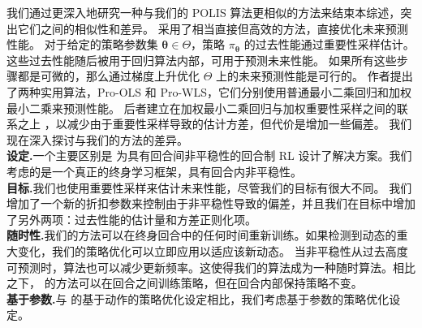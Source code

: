 我们通过更深入地研究一种与我们的 POLIS 算法更相似的方法来结束本综述，突出它们之间的相似性和差异。
\cite{chandak2020optimizing} 采用了相当直接但高效的方法，直接优化未来预测性能。
对于给定的策略参数集 $\boldsymbol\theta\in\Theta$，策略 $\pi_{\boldsymbol\theta}$ 的过去性能通过重要性采样估计。
这些过去性能随后被用于回归算法内部，可用于预测未来性能。
如果所有这些步骤都是可微的，那么通过梯度上升优化 $\Theta$ 上的未来预测性能是可行的。
作者提出了两种实用算法，Pro-OLS 和 Pro-WLS，它们分别使用普通最小二乘回归和加权最小二乘来预测性能。
后者建立在加权最小二乘回归与加权重要性采样之间的联系之上 \cite{hachiya2012importance,mahmood2014weighted}，以减少由于重要性采样导致的估计方差，但代价是增加一些偏差。
我们现在深入探讨与我们的方法的差异。
\\
\noindent\textbf{设定.}\indent 一个主要区别是 \cite{chandak2020optimizing} 为具有回合间非平稳性的回合制 RL 设计了解决方案。我们考虑的是一个真正的终身学习框架，具有回合内非平稳性。
\\
\noindent\textbf{目标.}\indent 我们也使用重要性采样来估计未来性能，尽管我们的目标有很大不同。
我们增加了一个新的折扣参数来控制由于非平稳性导致的偏差，并且我们在目标中增加了另外两项：过去性能的估计量和方差正则化项。
\\
\noindent\textbf{随时性.}\indent 我们的方法可以在终身回合中的任何时间重新训练。如果检测到动态的重大变化，我们的策略优化可以立即应用以适应该新动态。
当非平稳性从过去高度可预测时，算法也可以减少更新频率。这使得我们的算法成为一种随时算法。相比之下，\cite{chandak2020optimizing} 的方法可以在回合之间训练策略，但在回合内部保持策略不变。
\\
\noindent\textbf{基于参数.}\indent 与 \cite{chandak2020optimizing} 的基于动作的策略优化设定相比，我们考虑基于参数的策略优化设定。\\
